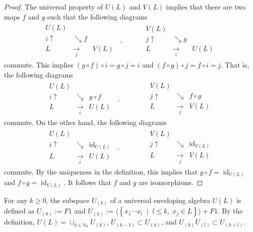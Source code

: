 \documentclass[12pt,MSc]{muthesis_2023}
\theoremstyle{plain}%
\theoremstyle{definition}
\theoremstyle{remark}
\DeclareMathOperator{\id}{id}
\begin{document}
\begin{proof}
The universal property of $U(L)$ and $V(L)$ implies that there are two maps $f$ and $g$ such that the following diagrams
\begin{align*}
\begin{matrix}
U(L) && \\
i \uparrow &\searrow f &\\
L & \xrightarrow[j]{} & V(L)
\end{matrix}\;\;,
\quad&\quad
\begin{matrix}
V(L) && \\
j \uparrow &\searrow g &\\
L & \xrightarrow[i]{} & U(L)
\end{matrix}
\end{align*}
commute. This implies $(g\circ f)\circ i = g\circ j =i$ and $(f\circ g)\circ j=f\circ i=j$. That is, the following diagrams
\begin{align*}
\begin{matrix}
U(L) && \\
i \uparrow &\searrow &g\circ f \\
L & \xrightarrow[i]{} & U(L)
\end{matrix}\;\;,
\quad\quad&\quad
\begin{matrix}
V(L) && \\
j \uparrow &\searrow &f\circ g \\
L & \xrightarrow[j]{} & V(L)
\end{matrix}
\end{align*}
commute. On the other hand, the following diagrams
\begin{align*}
\begin{matrix}
U(L) && \\
i \uparrow &\searrow &\id_{U(L)} \\
L & \xrightarrow[i]{} & U(L)
\end{matrix}\;\;,
\quad\quad&\quad
\begin{matrix}
V(L) && \\
j \uparrow &\searrow &\id_{V(L)} \\
L & \xrightarrow[j]{} & V(L)
\end{matrix}
\end{align*}
commute. By the uniqueness in the definition, this implies that $g\circ f=\id_{U(L)}$ and $f\circ g=\id_{V(L)}$. It follows that $f$ and $g$ are isomorphisms.
\end{proof}
For any $k\geq 0$, the subspace $U_{(k)}$ of a universal enveloping algebra $U(L)$ is defined as $U_{(0)} := F1$ and $U_{(k)}:=\langle \left\{x_1\cdots x_l \;\;|\;\; l \leq k,\; x_j \in L \right\}\rangle + F1$. By the definition, $U(L)=\cup_{k\in \mathbb{N}_0} U_{(k)}$, $U_{(k-1)} \subset U_{(k)}$, and $U_{(k)}U_{(l)} \subset U_{(k+l)}$.
\end{document}
